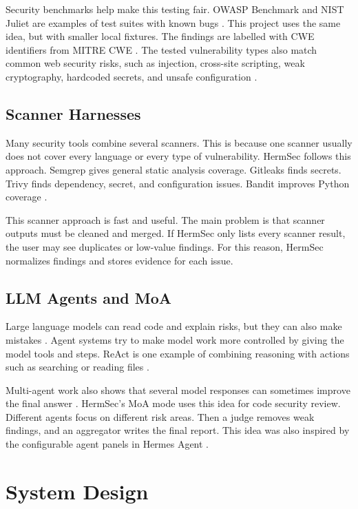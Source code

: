 \documentclass[sigconf,nonacm]{acmart}
\begin{document}
Security benchmarks help make this testing fair. OWASP Benchmark and NIST Juliet are examples of test suites with known bugs \cite{owaspbenchmark,nistjuliet}. This project uses the same idea, but with smaller local fixtures. The findings are labelled with CWE identifiers from MITRE CWE \cite{mitrecwe}. The tested vulnerability types also match common web security risks, such as injection, cross-site scripting, weak cryptography, hardcoded secrets, and unsafe configuration \cite{owasptop10}.

\subsection{Scanner Harnesses}
Many security tools combine several scanners. This is because one scanner usually does not cover every language or every type of vulnerability. HermSec follows this approach. Semgrep gives general static analysis coverage. Gitleaks finds secrets. Trivy finds dependency, secret, and configuration issues. Bandit improves Python coverage \cite{semgrep,gitleaks,trivy,bandit}.

This scanner approach is fast and useful. The main problem is that scanner outputs must be cleaned and merged. If HermSec only lists every scanner result, the user may see duplicates or low-value findings. For this reason, HermSec normalizes findings and stores evidence for each issue.

\subsection{LLM Agents and MoA}
Large language models can read code and explain risks, but they can also make mistakes \cite{pearce2022asleep}. Agent systems try to make model work more controlled by giving the model tools and steps. ReAct is one example of combining reasoning with actions such as searching or reading files \cite{yao2023react}.

Multi-agent work also shows that several model responses can sometimes improve the final answer \cite{du2023debate,wang2024moa}. HermSec's MoA mode uses this idea for code security review. Different agents focus on different risk areas. Then a judge removes weak findings, and an aggregator writes the final report. This idea was also inspired by the configurable agent panels in Hermes Agent \cite{nous2026hermesagent}.

\section{System Design}
\end{document}
